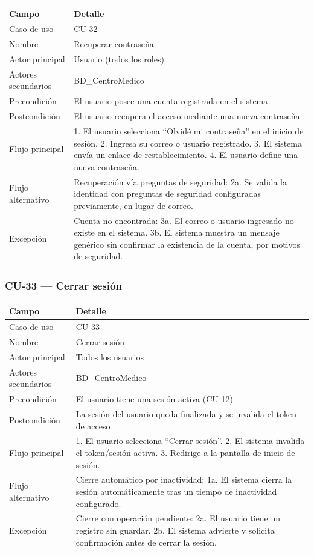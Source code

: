 \documentclass[11pt,a4paper]{article}
\begin{document}
	\begin{longtable}{p{} p{} }
		\toprule
		\textbf{Campo} & \textbf{Detalle} \\
		\midrule
		\endhead
		Caso de uso & CU-32 \\
		Nombre & Recuperar contraseña \\
		Actor principal & Usuario (todos los roles) \\
		Actores secundarios & BD\_CentroMedico \\
		Precondición & El usuario posee una cuenta registrada en el sistema \\
		Postcondición & El usuario recupera el acceso mediante una nueva contraseña \\
		Flujo principal & 1. El usuario selecciona ``Olvidé mi contraseña'' en el inicio de sesión. 2. Ingresa su correo o usuario registrado. 3. El sistema envía un enlace de restablecimiento. 4. El usuario define una nueva contraseña. \\
		Flujo alternativo & Recuperación vía preguntas de seguridad: 2a. Se valida la identidad con preguntas de seguridad configuradas previamente, en lugar de correo. \\
		Excepción & Cuenta no encontrada: 3a. El correo o usuario ingresado no existe en el sistema. 3b. El sistema muestra un mensaje genérico sin confirmar la existencia de la cuenta, por motivos de seguridad. \\
		\bottomrule
	\end{longtable}
	
	\subsubsection{CU-33 --- Cerrar sesión}
	
	\begin{longtable}{p{} p{} }
		\toprule
		\textbf{Campo} & \textbf{Detalle} \\
		\midrule
		\endhead
		Caso de uso & CU-33 \\
		Nombre & Cerrar sesión \\
		Actor principal & Todos los usuarios \\
		Actores secundarios & BD\_CentroMedico \\
		Precondición & El usuario tiene una sesión activa (CU-12) \\
		Postcondición & La sesión del usuario queda finalizada y se invalida el token de acceso \\
		Flujo principal & 1. El usuario selecciona ``Cerrar sesión''. 2. El sistema invalida el token/sesión activa. 3. Redirige a la pantalla de inicio de sesión. \\
		Flujo alternativo & Cierre automático por inactividad: 1a. El sistema cierra la sesión automáticamente tras un tiempo de inactividad configurado. \\
		Excepción & Cierre con operación pendiente: 2a. El usuario tiene un registro sin guardar. 2b. El sistema advierte y solicita confirmación antes de cerrar la sesión. \\
		\bottomrule
	\end{longtable}
	
\end{document}
